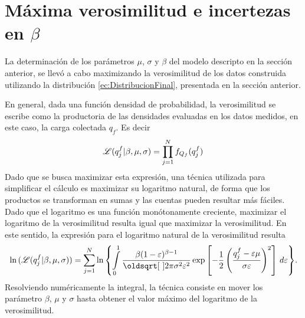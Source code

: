 \section{Máxima verosimilitud e incertezas en \texorpdfstring{$\beta$}{beta}\label{sec:MaximaVerosimilitud}}
\noindent La determinación de los parámetros $\mu$, $\sigma$ y $\beta$ del modelo descripto en la sección anterior, se llevó a cabo maximizando la verosimilitud de los datos construida utilizando la distribución \eqref{ec:DistribucionFinal}, presentada en la sección anterior. 

En general, dada una función densidad de probabilidad, la verosimilitud se escribe como la productoria de las densidades evaluadas en los datos medidos, en este caso, la carga colectada $q_{f}$. Es decir
\begin{equation*}
    \mathscr{L}(q_{j}^{f} | \beta, \mu, \sigma) 
    = \prod\limits_{j = 1}^{N}
    f_{Q_{f}}(q_{j}^{f})
\end{equation*}
Dado que se busca maximizar esta expresión, una técnica utilizada para simplificar el cálculo es maximizar su logaritmo natural, de forma que los productos se transforman en sumas y las cuentas pueden resultar más fáciles. Dado que el logaritmo es una función monótonamente creciente, maximizar el logaritmo de la verosimilitud resulta igual que maximizar la verosimilitud. En este sentido, la expresión para el logaritmo natural de la verosimilitud resulta
\begin{equation}
    \ln{(\Lagr(q_{j}^{f}|\beta, \mu, \sigma))}
    = \sum\limits_{j = 1}^{N}
    \ln{
        \left\{
            \int\limits_{0}^{1}
            \frac{\beta(1-\varepsilon)^{\beta - 1}}{\sqrt{2\pi \sigma^{2}\varepsilon^{2}}}
            \exp
                \left[
                    -\frac{1}{2}
                    \left(
                        \frac{q_{j}^{f} - \varepsilon\mu}{\sigma\varepsilon}
                    \right)^{2}
                \right]\,
            d\varepsilon
        \right\}
    }.
\end{equation}
Resolviendo numéricamente la integral, la técnica consiste en mover los parámetro $\beta$, $\mu$ y $\sigma$ hasta obtener el valor máximo del logaritmo de la verosimilitud. 

